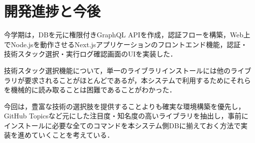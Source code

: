 \documentclass[main]{subfiles}
\begin{document}
\section{開発進捗と今後}
 今学期は，DBを元に権限付きGraphQL APIを作成，認証フローを構築，Web上でNode.jsを動作させるNext.jsアプリケーションのフロントエンド機能，認証・技術スタック選択・実行ログ確認画面のUIを実装した．

 技術スタック選択機能について，単一のライブラリインストールには他のライブラリが要求されることがほとんどであるが，本システムで利用するためにそれらを機械的に読み取ることは困難であることがわかった．

 今回は，豊富な技術の選択肢を提供することよりも確実な環境構築を優先し，GitHub Topicsなど元にした注目度・知名度の高いライブラリを抽出し，事前にインストールに必要な全てのコマンドを本システム側DBに揃えておく方法で実装を進めていくことを考えている．
\end{document}
